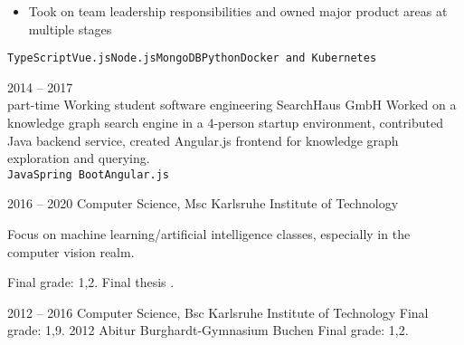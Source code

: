 \documentclass[8pt]{developercv} %
\newcommand{\linebreaksmall}{\vspace{2mm}}
\begin{document}
\begin{entrylist}
{\begin{itemize}[nosep, topsep=0pt, left=5pt, after=\vspace{6pt}]
			\item Took on team leadership responsibilities and owned major product areas at multiple stages
		\end{itemize}
		 \texttt{TypeScript}\slashsep\texttt{Vue.js}\slashsep\texttt{Node.js}\slashsep\texttt{MongoDB}\slashsep\texttt{Python}\slashsep\texttt{Docker and Kubernetes}} \linebreaksmall
	\entry
		{2014 -- 2017\\\footnotesize{part-time}}
		{Working student software engineering}
		{SearchHaus GmbH}
		{Worked on a knowledge graph search engine in a 4-person startup environment, contributed Java backend service, created Angular.js frontend for knowledge graph exploration and querying.
		\linebreaksmall \\ \texttt{Java}\slashsep\texttt{Spring Boot}\slashsep\texttt{Angular.js}}
\end{entrylist}



\begin{entrylist}
	\entry
		{2016 -- 2020}
		{Computer Science, Msc}
		{Karlsruhe Institute of Technology}
		{Focus on machine learning/artificial intelligence classes, especially in the computer vision realm.
		
		Final grade: 1,2. Final thesis .}
	\entry
		{2012 -- 2016}
		{Computer Science, Bsc}
		{Karlsruhe Institute of Technology}
		{Final grade: 1,9.}
	\entry
		{2012}
		{Abitur}
		{Burghardt-Gymnasium Buchen}
		{Final grade: 1,2.}
\end{entrylist}

\end{document}
